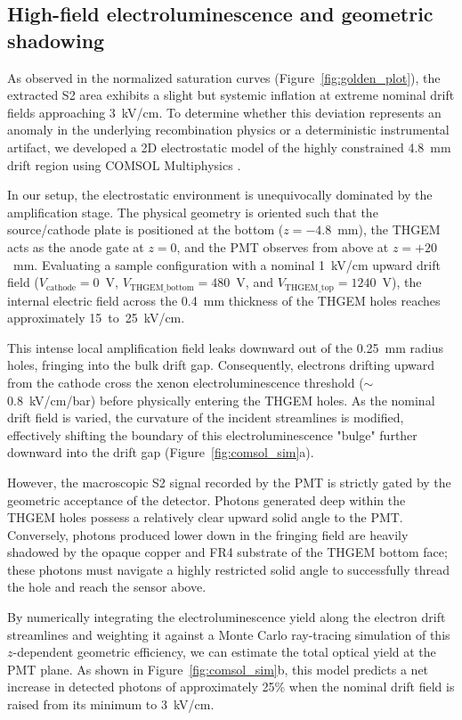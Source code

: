 \subsection{High-field electroluminescence and geometric shadowing}

As observed in the normalized saturation curves (Figure~\ref{fig:golden_plot}), the extracted S2
area exhibits a slight but systemic inflation at extreme nominal drift fields approaching 3~kV/cm.
To determine whether this deviation represents an anomaly in the underlying recombination physics
or a deterministic instrumental artifact, we developed a 2D electrostatic model of the highly
constrained 4.8~mm drift region using COMSOL Multiphysics \cite{noauthor_comsol_nodate}.

In our setup, the electrostatic environment is unequivocally dominated by the amplification stage.
The physical geometry is oriented such that the source/cathode plate is positioned at the bottom
($z = -4.8$~mm), the THGEM acts as the anode gate at $z = 0$, and the PMT observes from above at $z
= +20$~mm. Evaluating a sample configuration with a nominal 1~kV/cm upward drift field
($V_{\text{cathode}} = 0$~V, $V_{\text{THGEM\_bottom}} = 480$~V, and $V_{\text{THGEM\_top}} =
1240$~V), the internal electric field across the 0.4~mm thickness of the THGEM holes reaches
approximately 15~to~25~kV/cm.

This intense local amplification field leaks downward out of the 0.25~mm radius holes, fringing
into the bulk drift gap. Consequently, electrons drifting upward from the cathode cross the xenon
electroluminescence threshold ($\sim$0.8~kV/cm/bar) before physically entering the THGEM holes. As
the nominal drift field is varied, the curvature of the incident streamlines is modified,
effectively shifting the boundary of this electroluminescence "bulge" further downward into the
drift gap (Figure~\ref{fig:comsol_sim}a).

However, the macroscopic S2 signal recorded by the PMT is strictly gated by the geometric
acceptance of the detector. Photons generated deep within the THGEM holes possess a relatively
clear upward solid angle to the PMT. Conversely, photons produced lower down in the fringing field
are heavily shadowed by the opaque copper and FR4 substrate of the THGEM bottom face; these photons
must navigate a highly restricted solid angle to successfully thread the hole and reach the sensor
above.

By numerically integrating the electroluminescence yield along the electron drift streamlines and
weighting it against a Monte Carlo ray-tracing simulation of this $z$-dependent geometric
efficiency, we can estimate the total optical yield at the PMT plane. As shown in
Figure~\ref{fig:comsol_sim}b, this model predicts a net increase in detected photons of
approximately 25\% when the nominal drift field is raised from its minimum to 3~kV/cm.

